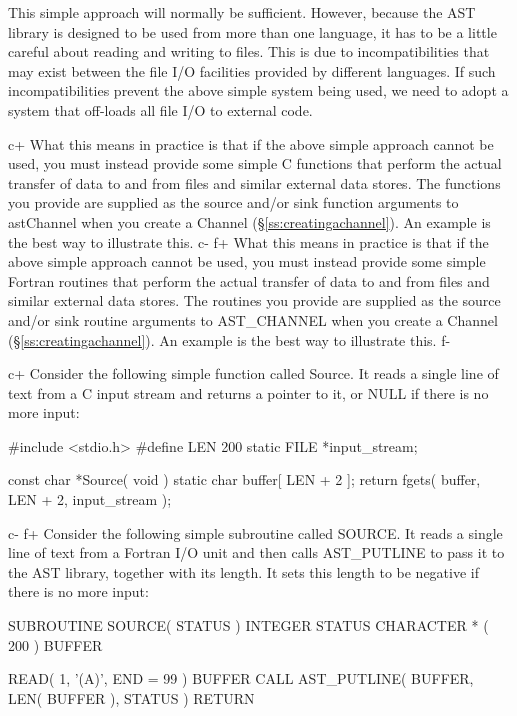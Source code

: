 \documentclass[twoside,11pt]{starlink}
\providecommand{\secref}[1]{\S\ref{#1}}
\begin{document}
{This simple approach will normally be sufficient. However, because the
AST library is designed to be used from more than one language, it has
to be a little careful about reading and writing to files. This is due
to incompatibilities that may exist between the file I/O facilities
provided by different languages. If such incompatibilities prevent the
above simple system being used, we need to adopt a system that off-loads
all file I/O to external code.

c+
What this means in practice is that if the above simple approach cannot
be used, you must instead provide some simple C
functions that perform the actual transfer of data to and from files
and similar external data stores. The functions you provide are
supplied as the source and/or sink function arguments to astChannel
when you create a Channel (\secref{ss:creatingachannel}). An example is
the best way to illustrate this.
c-
f+
What this means in practice is that if the above simple approach cannot
be used, you must instead provide some simple
Fortran routines that perform the actual transfer of data to and from
files and similar external data stores. The routines you provide are
supplied as the source and/or sink routine arguments to AST\_CHANNEL
when you create a Channel (\secref{ss:creatingachannel}). An example is
the best way to illustrate this.
f-

c+
Consider the following simple function called Source. It reads a
single line of text from a C input stream and returns a pointer to it,
or NULL if there is no more input:

\small
\begin{terminalv}
#include <stdio.h>
#define LEN 200
static FILE *input_stream;

const char *Source( void ) {
   static char buffer[ LEN + 2 ];
   return fgets( buffer, LEN + 2, input_stream );
}
\end{terminalv}
\normalsize
c-
f+
Consider the following simple subroutine called SOURCE. It reads a
single line of text from a Fortran I/O unit and then calls
AST\_PUTLINE to pass it to the AST library, together with its
length. It sets this length to be negative if there is no more input:

\small
\begin{terminalv}
      SUBROUTINE SOURCE( STATUS )
      INTEGER STATUS
      CHARACTER * ( 200 ) BUFFER

      READ( 1, '(A)', END = 99 ) BUFFER
      CALL AST_PUTLINE( BUFFER, LEN( BUFFER ), STATUS )
      RETURN


\end{terminalv}}
\end{document}
